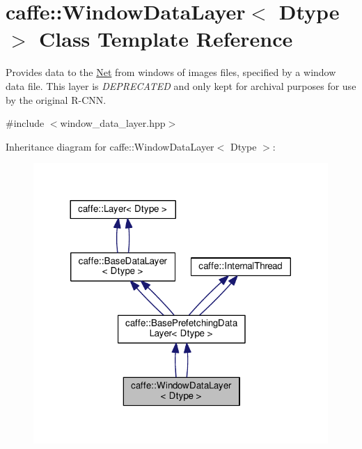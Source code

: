 \hypertarget{classcaffe_1_1_window_data_layer}{}\section{caffe\+:\+:Window\+Data\+Layer$<$ Dtype $>$ Class Template Reference}
\label{classcaffe_1_1_window_data_layer}


Provides data to the \mbox{\hyperlink{classcaffe_1_1_net}{Net}} from windows of images files, specified by a window data file. This layer is {\itshape D\+E\+P\+R\+E\+C\+A\+T\+ED} and only kept for archival purposes for use by the original R-\/\+C\+NN.  




{\ttfamily \#include $<$window\+\_\+data\+\_\+layer.\+hpp$>$}



Inheritance diagram for caffe\+:\+:Window\+Data\+Layer$<$ Dtype $>$\+:
\nopagebreak
\begin{figure}[H]
\begin{center}
\leavevmode
\includegraphics[width=317pt]{classcaffe_1_1_window_data_layer__inherit__graph}
\end{center}
\end{figure}
